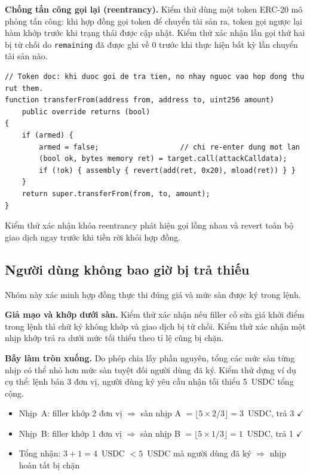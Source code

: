 \documentclass[../DoAn.tex]{subfiles}
\begin{document}
\textbf{Chống tấn công gọi lại (reentrancy).} Kiểm thử dùng một token ERC-20 mô phỏng tấn công: khi hợp đồng gọi token để chuyển tài sản ra, token gọi ngược lại hàm khớp trước khi trạng thái được cập nhật. Kiểm thử xác nhận lần gọi thứ hai bị từ chối do \texttt{remaining} đã được ghi về 0 trước khi thực hiện bất kỳ lần chuyển tài sản nào.

\begin{lstlisting}
// Token doc: khi duoc goi de tra tien, no nhay nguoc vao hop dong thu rut them.
function transferFrom(address from, address to, uint256 amount)
    public override returns (bool)
{
    if (armed) {
        armed = false;                   // chi re-enter dung mot lan
        (bool ok, bytes memory ret) = target.call(attackCalldata);
        if (!ok) { assembly { revert(add(ret, 0x20), mload(ret)) } }
    }
    return super.transferFrom(from, to, amount);
}
\end{lstlisting}

Kiểm thử  xác nhận khóa reentrancy phát hiện gọi lồng nhau và revert toàn bộ giao dịch ngay trước khi tiền rời khỏi hợp đồng.

\subsection{Người dùng không bao giờ bị trả thiếu}

Nhóm này xác minh hợp đồng thực thi đúng giá và mức sàn được ký trong lệnh.

\textbf{Giả mạo và khớp dưới sàn.} Kiểm thử  xác nhận nếu filler cố sửa giá khởi điểm trong lệnh thì chữ ký không khớp và giao dịch bị từ chối. Kiểm thử  xác nhận một nhịp khớp trả ra dưới mức tối thiểu theo tỉ lệ cũng bị chặn.

\textbf{Bẫy làm tròn xuống.} Do phép chia lấy phần nguyên, tổng các mức sàn từng nhịp có thể nhỏ hơn mức sàn tuyệt đối người dùng đã ký. Kiểm thử  dựng ví dụ cụ thể: lệnh bán 3 đơn vị, người dùng ký yêu cầu nhận tối thiểu 5~USDC tổng cộng.

\begin{itemize}
    \item Nhịp~A: filler khớp 2 đơn vị $\Rightarrow$ sàn nhịp A $= \lfloor 5 \times 2 / 3 \rfloor = 3$~USDC, trả 3 $\checkmark$
    \item Nhịp~B: filler khớp 1 đơn vị $\Rightarrow$ sàn nhịp B $= \lfloor 5 \times 1 / 3 \rfloor = 1$~USDC, trả 1 $\checkmark$
    \item Tổng nhận: $3 + 1 = 4$~USDC $< 5$~USDC mà người dùng đã ký $\Rightarrow$ nhịp hoàn tất bị chặn
\end{itemize}
\end{document}
